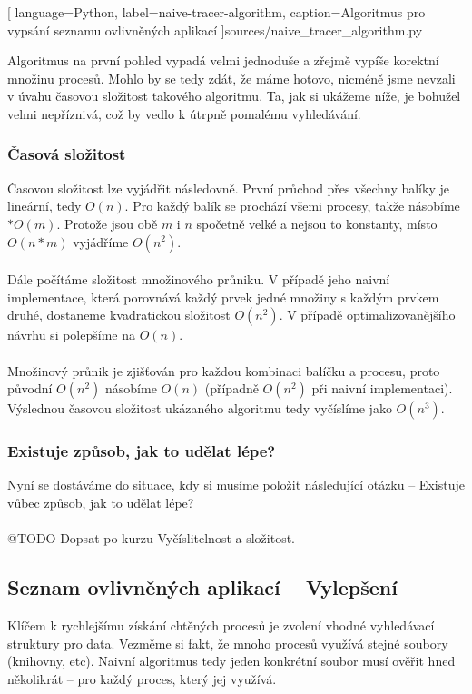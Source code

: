 \documentclass[10pt,a4paper]{article}
\begin{document}
		
		[
			language={Python},
			label=naive-tracer-algorithm,
			caption={Algoritmus pro vypsání seznamu ovlivněných aplikací}
		]{sources/naive_tracer_algorithm.py}

		Algoritmus na první pohled vypadá velmi jednoduše a zřejmě vypíše korektní množinu procesů. Mohlo by se tedy zdát, že máme hotovo, nicméně jsme nevzali v úvahu časovou složitost takového algoritmu. Ta, jak si ukážeme níže, je bohužel velmi nepříznivá, což by vedlo k útrpně pomalému vyhledávání.

			\subsubsection*{Časová složitost}
			Časovou složitost lze vyjádřit následovně. První průchod přes všechny balíky je lineární, tedy $O(n)$. Pro každý balík se prochází všemi procesy, takže násobíme $* O(m)$. Protože jsou obě $m$ i $n$ spočetně velké a nejsou to konstanty, místo $O(n*m)$ vyjádříme $O(n^2)$.
			\\
			\\
			Dále počítáme složitost množinového průniku. V případě jeho naivní implementace, která porovnává každý prvek jedné množiny s každým prvkem druhé, dostaneme kvadratickou složitost $O(n^2)$. V případě optimalizovanějšího návrhu si polepšíme na $O(n)$.
			\\
			\\
			Množinový průnik je zjišťován pro každou kombinaci balíčku a procesu, proto původní $O(n^2)$ násobíme $O(n)$ (případně $O(n^2)$ při naivní implementaci). Výslednou časovou složitost ukázaného algoritmu tedy vyčíslíme jako $O(n^3)$.


			\subsubsection*{Existuje způsob, jak to udělat lépe?}
			Nyní se dostáváme do situace, kdy si musíme položit následující otázku -- Existuje vůbec způsob, jak to udělat lépe?
			\\
			\\
			@TODO Dopsat po kurzu Vyčíslitelnost a složitost.

		\subsection{Seznam ovlivněných aplikací -- Vylepšení}
		Klíčem k rychlejšímu získání chtěných procesů je zvolení vhodné vyhledávací struktury pro data. Vezměme si fakt, že mnoho procesů využívá stejné soubory (knihovny, etc). Naivní algoritmus tedy jeden konkrétní soubor musí ověřit hned několikrát -- pro každý proces, který jej využívá.
\end{document}
